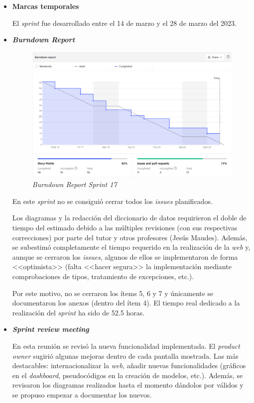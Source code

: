 \begin{itemize}
\begin{enumerate}
	\end{enumerate}
	\item \textbf{Marcas temporales}
	
	El \textit{sprint} fue desarrollado entre el 14 de marzo y el 28 de marzo del 2023.
	
	\item \textbf{\textit{Burndown Report}}
	
	\begin{figure}[h]
		\caption[\textit{Sprint} 17: \textit{burndown report}]{\textit{Burndown Report Sprint 17}}
		\centering
		\includegraphics[width=\textwidth]{../img/anexos/bdr/s17_bdr}
	\end{figure}
	
	En este \textit{sprint} no se consiguió cerrar todos los \textit{issues} planificados.
	
	Los diagramas y la redacción del diccionario de datos requirieron el doble de tiempo del estimado debido a las múltiples revisiones (con sus respectivas correcciones) por parte del tutor y otros profesores (Jesús Maudes).  Además, se subestimó completamente el tiempo requerido en la realización de la \textit{web} y, aunque se cerraron los \textit{issues}, algunos de ellos se implementaron de forma <<optimista>> (falta <<hacer segura>> la implementación mediante comprobaciones de tipos, tratamiento de excepciones, etc.).
	
	Por este motivo, no se cerraron los ítems 5, 6 y 7 y únicamente se documentaron los anexos (dentro del ítem 4). El tiempo real dedicado a la realización del \textit{sprint} ha sido de 52.5 horas.
	
	\item \textbf{\textit{Sprint review meeting}}
	
	En esta reunión se revisó la nueva funcionalidad implementada. El \textit{product owner} sugirió algunas mejoras dentro de cada pantalla mostrada. Las más destacables: internacionalizar la \textit{web}, añadir nuevas funcionalidades (gráficos en el \textit{dashboard}, pseudocódigos en la creación de modelos, etc.). Además, se revisaron los diagramas realizados hasta el momento dándolos por válidos y se propuso empezar a documentar los nuevos.
	
\end{itemize}



